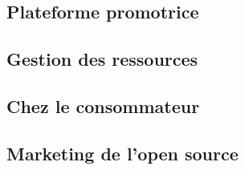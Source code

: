 \chapter*{\color{burntorange}{Etude terrain}} %
	\section{Plateforme promotrice}
	\section{Gestion des ressources}
	\section{Chez le consommateur}
	\section{Marketing de l'open source}